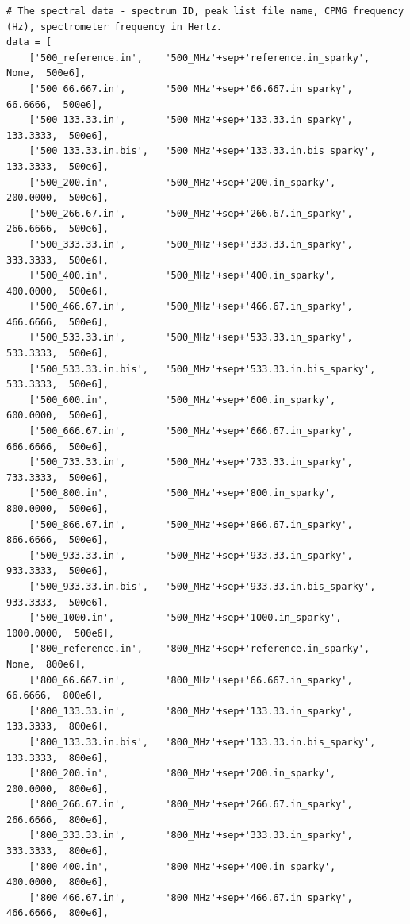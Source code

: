 \begin{lstlisting}
# The spectral data - spectrum ID, peak list file name, CPMG frequency (Hz), spectrometer frequency in Hertz.
data = [
    ['500_reference.in',    '500_MHz'+sep+'reference.in_sparky',           None,  500e6],
    ['500_66.667.in',       '500_MHz'+sep+'66.667.in_sparky',           66.6666,  500e6],
    ['500_133.33.in',       '500_MHz'+sep+'133.33.in_sparky',          133.3333,  500e6],
    ['500_133.33.in.bis',   '500_MHz'+sep+'133.33.in.bis_sparky',      133.3333,  500e6],
    ['500_200.in',          '500_MHz'+sep+'200.in_sparky',             200.0000,  500e6],
    ['500_266.67.in',       '500_MHz'+sep+'266.67.in_sparky',          266.6666,  500e6],
    ['500_333.33.in',       '500_MHz'+sep+'333.33.in_sparky',          333.3333,  500e6],
    ['500_400.in',          '500_MHz'+sep+'400.in_sparky',             400.0000,  500e6],
    ['500_466.67.in',       '500_MHz'+sep+'466.67.in_sparky',          466.6666,  500e6],
    ['500_533.33.in',       '500_MHz'+sep+'533.33.in_sparky',          533.3333,  500e6],
    ['500_533.33.in.bis',   '500_MHz'+sep+'533.33.in.bis_sparky',      533.3333,  500e6],
    ['500_600.in',          '500_MHz'+sep+'600.in_sparky',             600.0000,  500e6],
    ['500_666.67.in',       '500_MHz'+sep+'666.67.in_sparky',          666.6666,  500e6],
    ['500_733.33.in',       '500_MHz'+sep+'733.33.in_sparky',          733.3333,  500e6],
    ['500_800.in',          '500_MHz'+sep+'800.in_sparky',             800.0000,  500e6],
    ['500_866.67.in',       '500_MHz'+sep+'866.67.in_sparky',          866.6666,  500e6],
    ['500_933.33.in',       '500_MHz'+sep+'933.33.in_sparky',          933.3333,  500e6],
    ['500_933.33.in.bis',   '500_MHz'+sep+'933.33.in.bis_sparky',      933.3333,  500e6],
    ['500_1000.in',         '500_MHz'+sep+'1000.in_sparky',           1000.0000,  500e6],
    ['800_reference.in',    '800_MHz'+sep+'reference.in_sparky',           None,  800e6],
    ['800_66.667.in',       '800_MHz'+sep+'66.667.in_sparky',           66.6666,  800e6],
    ['800_133.33.in',       '800_MHz'+sep+'133.33.in_sparky',          133.3333,  800e6],
    ['800_133.33.in.bis',   '800_MHz'+sep+'133.33.in.bis_sparky',      133.3333,  800e6],
    ['800_200.in',          '800_MHz'+sep+'200.in_sparky',             200.0000,  800e6],
    ['800_266.67.in',       '800_MHz'+sep+'266.67.in_sparky',          266.6666,  800e6],
    ['800_333.33.in',       '800_MHz'+sep+'333.33.in_sparky',          333.3333,  800e6],
    ['800_400.in',          '800_MHz'+sep+'400.in_sparky',             400.0000,  800e6],
    ['800_466.67.in',       '800_MHz'+sep+'466.67.in_sparky',          466.6666,  800e6],

\end{lstlisting}
